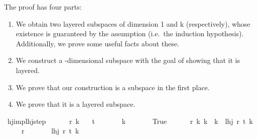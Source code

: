 \begin{isabellebody}
{\isafoldproof}%
%
\isadelimproof
%
\endisadelimproof
%
\isadelimdocument
%
\endisadelimdocument
%
\isatagdocument
%
\isamarkuptrue%
%
\endisatagdocument
{\isafolddocument}%
%
\isadelimdocument
%
\endisadelimdocument
%
\begin{isamarkuptext}%
The proof has four parts:
\begin{enumerate}
\item We obtain two layered subspaces of dimension 1 and k (respectively), whose existence is guaranteed by the assumption  (i.e.\ the induction hypothesis). Additionally, we prove some useful facts about these.
\item We construct a -dimensional subspace with the goal of showing that it is layered.
\item We prove that our construction is a subspace in the first place.
\item We prove that it is a layered subspace.
\end{enumerate}%
\end{isamarkuptext}\isamarkuptrue%
\isamarkupfalse%
\ hj{\isacharunderscore}{\kern0pt}imp{\isacharunderscore}{\kern0pt}lhj{\isacharunderscore}{\kern0pt}step{\isacharcolon}{\kern0pt}\ \isanewline
\ \ \ \ \ r\ k\isanewline
\ \ \ {\isachardoublequoteopen}t\ {\isachargreater}{\kern0pt}\ {}{\isachardoublequoteclose}\isanewline
\ \ \ \ \ {\isachardoublequoteopen}k\ {\isasymge}\ {}{\isachardoublequoteclose}\isanewline
\ \ \ \ \ {\isachardoublequoteopen}True{\isachardoublequoteclose}\ \isanewline
\ \ \ \ \ {\isachardoublequoteopen}{\isacharparenleft}{\kern0pt}{\isasymAnd}r\ k{\isacharprime}{\kern0pt}{\isachardot}{\kern0pt}\ k{\isacharprime}{\kern0pt}\ {\isasymle}\ k\ {\isasymLongrightarrow}\ lhj\ r\ t\ k{\isacharprime}{\kern0pt}{\isacharparenright}{\kern0pt}{\isachardoublequoteclose}\ \isanewline
\ \ \ \ \ {\isachardoublequoteopen}r\ {\isachargreater}{\kern0pt}\ {}{\isachardoublequoteclose}\isanewline
\ \ \ \ \ {\isachardoublequoteopen}lhj\ r\ t\ {\isacharparenleft}{\kern0pt}k{\isacharplus}{\kern0pt}{}{\isacharparenright}{\kern0pt}{\isachardoublequoteclose}\isanewline
%
\isadelimproof
%
\endisadelimproof
%
\isatagproof
{}\isamarkupfalse%
{\isacharminus}{\kern0pt}\isanewline
\ \ \isamarkupfalse%

\end{isabellebody}
